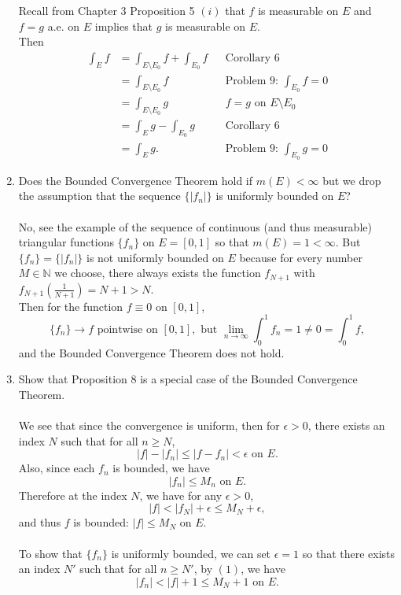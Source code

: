 \begin{enumerate}
    Recall from Chapter 3 Proposition 5 $(i)$ that $f$ is measurable on $E$ and $f=g$ a.e. on $E$ implies that $g$ is measurable on $E$.
    \\Then 
    \begin{align*}
        \int_Ef&=\int_{E\setminus E_0}f+\int_{E_0}f&&\text{Corollary 6}\\
        &=\int_{E\setminus E_0}f&&\text{Problem 9: }\int_{E_0}f=0\\
        &=\int_{E\setminus E_0}g&&\text{$f=g$ on $E\setminus E_0$}\\
        &=\int_Eg-\int_{E_0}g&&\text{Corollary 6}\\
        &=\int_Eg.&&\text{Problem 9: }\int_{E_0}g=0
    \end{align*}
    \item Does the Bounded Convergence Theorem hold if $m(E)<\infty$ but we drop the assumption that the sequence $\{|f_n|\}$ is uniformly bounded on $E$?\\ 
    \\No, see the example of the sequence of continuous (and thus measurable) triangular functions $\{f_n\}$ on $E=[0,1]$ so that $m(E)=1<\infty$.
    But $\{f_n\}=\{|f_n|\}$ is not uniformly bounded on $E$ because for every number $M\in\mathbb{N}$ we choose, there always exists the function $f_{N+1}$ with $f_{N+1}(\frac{1}{N+1})=N+1>N$.
    \\Then for the function $f\equiv0$ on $[0,1]$,
    \[
        \{f_n\}\to f\text{ pointwise on }[0,1],\text{ but }\lim_{n\to\infty}\int_0^1f_n=1\neq0=\int_0^1f,
    \]
    and the Bounded Convergence Theorem does not hold.
    \item Show that Proposition 8 is a special case of the Bounded Convergence Theorem.\\
    \\We see that since the convergence is uniform, then for $\epsilon>0$, there exists an index $N$ such that for all $n\ge N$,
    \[
        |f|-|f_n|\le|f-f_n|<\epsilon\text{ on }E.\tag{1}
    \]
    Also, since each $f_n$ is bounded, we have 
    \[
        |f_n|\le M_n\text{ on }E.
    \]
    Therefore at the index $N$, we have for any $\epsilon>0$,
    \[
        |f|<|f_N|+\epsilon\le M_N+\epsilon,
    \]
    and thus $f$ is bounded: $|f|\le M_N$ on $E$.\\
    \\To show that $\{f_n\}$ is uniformly bounded, we can set $\epsilon=1$ so that there exists an index $N'$ such that for all $n\ge N'$, by $(1)$, we have
    \[
        |f_n|<|f|+1\le M_N+1\text{ on }E.
\]
\end{enumerate}
